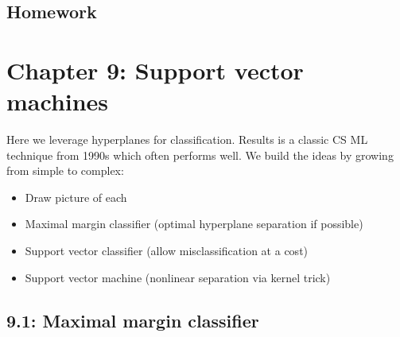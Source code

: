 \documentclass{article}
\begin{document}
\subsection*{Homework}

\section*{Chapter 9: Support vector machines} 

Here we leverage hyperplanes for classification. Results is a classic CS ML technique from 1990s which often performs well. We build the ideas by growing from simple to complex:
\begin{itemize}
\item Draw picture of each
\item Maximal margin classifier (optimal hyperplane separation if possible)
\item Support vector classifier (allow misclassification at a cost)
\item Support vector machine (nonlinear separation via kernel trick)
\end{itemize}

\subsection*{9.1: Maximal margin classifier}
\end{document}
